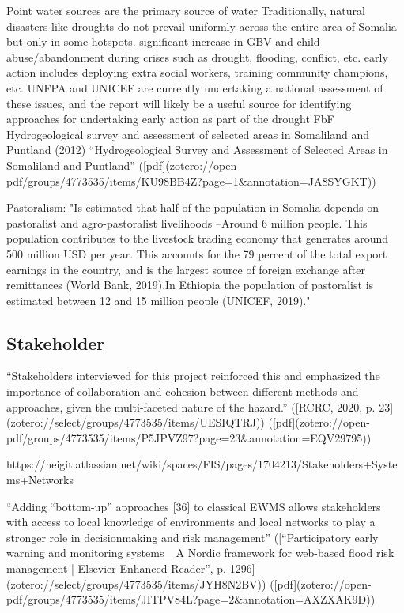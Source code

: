 {{Point water sources are the primary source of water
Traditionally, natural disasters like droughts do not prevail uniformly across the entire area of Somalia but only in some hotspots.
significant increase in GBV and child abuse/abandonment during crises such as drought, flooding, conflict, etc. early action includes deploying extra social workers, training community champions, etc. UNFPA and UNICEF are currently undertaking a national assessment of these issues, and the report will likely be a useful source for identifying approaches for undertaking early action as part of the drought FbF
Hydrogeological survey and assessment of selected areas in Somaliland and Puntland (2012)
“Hydrogeological Survey and Assessment of Selected Areas in Somaliland and Puntland” ([pdf](zotero://open-pdf/groups/4773535/items/KU98BB4Z?page=1&annotation=JA8SYGKT))


Pastoralism: 
"Is estimated that half of the population in Somalia depends on pastoralist and agro-pastoralist livelihoods –Around 6 million people. This population contributes to the livestock trading economy that generates around 500 million USD per year. This accounts for the 79 percent of the total export earnings in the country, and is the largest source of foreign exchange after remittances (World Bank, 2019).In Ethiopia the population of pastoralist is estimated between 12 and 15 million people (UNICEF, 2019)."

\subsection{Stakeholder}

“Stakeholders interviewed for this project reinforced this and emphasized the importance of collaboration and cohesion between different methods and approaches, given the multi-faceted nature of the hazard.” ([RCRC, 2020, p. 23](zotero://select/groups/4773535/items/UESIQTRJ)) ([pdf](zotero://open-pdf/groups/4773535/items/P5JPVZ97?page=23&annotation=EQV29795))

https://heigit.atlassian.net/wiki/spaces/FIS/pages/1704213/Stakeholders+Systems+Networks

“Adding “bottom-up” approaches [36] to classical EWMS allows stakeholders with access to local knowledge of environments and local networks to play a stronger role in decisionmaking and risk management” ([“Participatory early warning and monitoring systems_ A Nordic framework for web-based flood risk management | Elsevier Enhanced Reader”, p. 1296](zotero://select/groups/4773535/items/JYH8N2BV)) ([pdf](zotero://open-pdf/groups/4773535/items/JITPV84L?page=2&annotation=AXZXAK9D))

}}
